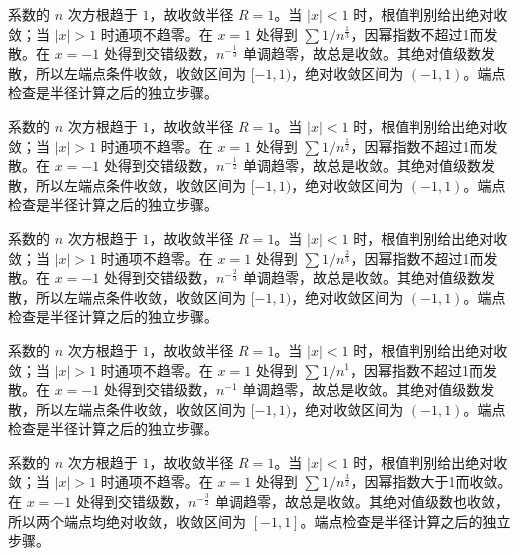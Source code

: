 \documentclass[UTF8,12pt,a4paper,fontset=fandol]{ctexart}
\begin{document}
\begin{solve}\label{ans:c26q2}
系数的 $n$ 次方根趋于 $1$，故收敛半径 $R=1$。当 $|x|<1$ 时，根值判别给出绝对收敛；当 $|x|>1$ 时通项不趋零。在 $x=1$ 处得到 $\sum1/n^{\frac{1}{3}}$，因幂指数不超过1而发散。在 $x=-1$ 处得到交错级数，$n^{-\frac{1}{3}}$ 单调趋零，故总是收敛。其绝对值级数发散，所以左端点条件收敛，收敛区间为 $[-1,1)$，绝对收敛区间为 $(-1,1)$。端点检查是半径计算之后的独立步骤。
\end{solve}

\begin{solve}\label{ans:c26q3}
系数的 $n$ 次方根趋于 $1$，故收敛半径 $R=1$。当 $|x|<1$ 时，根值判别给出绝对收敛；当 $|x|>1$ 时通项不趋零。在 $x=1$ 处得到 $\sum1/n^{\frac{1}{2}}$，因幂指数不超过1而发散。在 $x=-1$ 处得到交错级数，$n^{-\frac{1}{2}}$ 单调趋零，故总是收敛。其绝对值级数发散，所以左端点条件收敛，收敛区间为 $[-1,1)$，绝对收敛区间为 $(-1,1)$。端点检查是半径计算之后的独立步骤。
\end{solve}

\begin{solve}\label{ans:c26q4}
系数的 $n$ 次方根趋于 $1$，故收敛半径 $R=1$。当 $|x|<1$ 时，根值判别给出绝对收敛；当 $|x|>1$ 时通项不趋零。在 $x=1$ 处得到 $\sum1/n^{\frac{2}{3}}$，因幂指数不超过1而发散。在 $x=-1$ 处得到交错级数，$n^{-\frac{2}{3}}$ 单调趋零，故总是收敛。其绝对值级数发散，所以左端点条件收敛，收敛区间为 $[-1,1)$，绝对收敛区间为 $(-1,1)$。端点检查是半径计算之后的独立步骤。
\end{solve}

\begin{solve}\label{ans:c26q5}
系数的 $n$ 次方根趋于 $1$，故收敛半径 $R=1$。当 $|x|<1$ 时，根值判别给出绝对收敛；当 $|x|>1$ 时通项不趋零。在 $x=1$ 处得到 $\sum1/n^{1}$，因幂指数不超过1而发散。在 $x=-1$ 处得到交错级数，$n^{-1}$ 单调趋零，故总是收敛。其绝对值级数发散，所以左端点条件收敛，收敛区间为 $[-1,1)$，绝对收敛区间为 $(-1,1)$。端点检查是半径计算之后的独立步骤。
\end{solve}

\begin{solve}\label{ans:c26q6}
系数的 $n$ 次方根趋于 $1$，故收敛半径 $R=1$。当 $|x|<1$ 时，根值判别给出绝对收敛；当 $|x|>1$ 时通项不趋零。在 $x=1$ 处得到 $\sum1/n^{\frac{3}{2}}$，因幂指数大于1而收敛。在 $x=-1$ 处得到交错级数，$n^{-\frac{3}{2}}$ 单调趋零，故总是收敛。其绝对值级数也收敛，所以两个端点均绝对收敛，收敛区间为 $[-1,1]$。端点检查是半径计算之后的独立步骤。
\end{solve}
\end{document}
